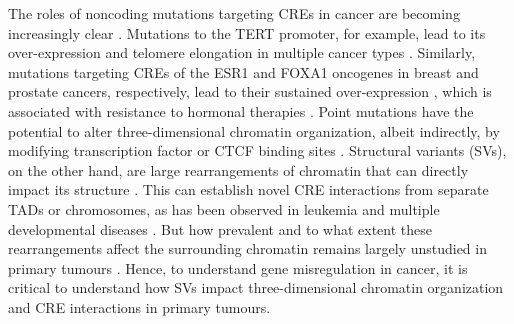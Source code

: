 The roles of noncoding mutations targeting CREs in cancer are becoming increasingly clear \cite{zhouEmergenceNoncodingCancer2016,rheinbayAnalysesNoncodingSomatic2020,liPatternsSomaticStructural2020}.
Mutations to the TERT promoter, for example, lead to its over-expression and telomere elongation in multiple cancer types \cite{vinagreFrequencyTERTPromoter2013,huangHighlyRecurrentTERT2013,sternMutationTERTPromoter2015}.
Similarly, mutations targeting CREs of the ESR1 and FOXA1 oncogenes in breast and prostate cancers, respectively, lead to their sustained over-expression \cite{baileyNoncodingSomaticInherited2016,zhouNoncodingMutationsTarget2020,paroliaDistinctStructuralClasses2019}, which is associated with resistance to hormonal therapies \cite{jeselsohnESR1MutationsMechanism2015,robinsonFoxA1KeyMediator2012,fuFOXA1OverexpressionMediates2016,fuFOXA1UpregulationPromotes2019}.
Point mutations have the potential to alter three-dimensional chromatin organization, albeit indirectly, by modifying transcription factor or CTCF binding sites \cite{mauranoLargescaleIdentificationSequence2015,guoMutationHotspotsCTCF2018}.
Structural variants (SVs), on the other hand, are large rearrangements of chromatin that can directly impact its structure \cite{dixonIntegrativeDetectionAnalysis2018,akdemirDisruptionChromatinFolding2020}.
This can establish novel CRE interactions from separate TADs or chromosomes, as has been observed in leukemia \cite{hniszActivationProtooncogenesDisruption2016} and multiple developmental diseases \cite{lupianezDisruptionsTopologicalChromatin2015,allouNoncodingDeletionsIdentify2021}.
But how prevalent and to what extent these rearrangements affect the surrounding chromatin remains largely unstudied in primary tumours \cite{akdemirDisruptionChromatinFolding2020,liPatternsSomaticStructural2020,iyyankiSubtypeassociatedEpigenomicLandscape2021}.
Hence, to understand gene misregulation in cancer, it is critical to understand how SVs impact three-dimensional chromatin organization and CRE interactions in primary tumours.

